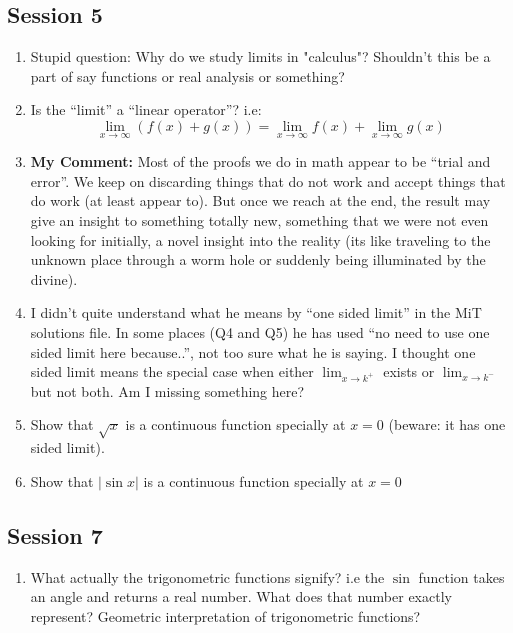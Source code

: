 \documentclass[]{article}
\begin{document}
\subsection{Session 5}

\begin{enumerate}
	\item Stupid question: Why do we study limits in "calculus"? Shouldn't this be a part of say functions or real analysis or something?
	
	\item Is the ``limit'' a ``linear operator''? i.e: 
	$$\lim_{x\to\infty} \left(f(x)+g(x)\right) = \lim_{x\to\infty} f(x) + \lim_{x\to\infty} g(x)$$
	
	\item \textbf{My Comment:} Most of the proofs we do in math appear to be ``trial and error''. We keep on discarding things that do not work and accept things that do work (at least appear to). But once we reach at the end, the result may give an insight to something totally new, something that we were not even looking for initially, a novel insight into the reality (its like traveling to the unknown place through a worm hole or suddenly being illuminated by the divine).
	
	\item I didn't quite understand what he means by ``one sided limit'' in the MiT solutions file. In some places (Q4 and Q5) he has used ``no need to use one sided limit here because..'', not too sure what he is saying. I thought one sided limit means the special case when either $\lim_{x\to k^{+}}$ exists or $\lim_{x\to k^{-}}$ but not both. Am I missing something here?
	
	\item Show that $\sqrt{x}$ is a continuous function specially at $x=0$ (beware: it has one sided limit).
	
	\item Show that $|\sin{x}|$ is a continuous function specially at $x=0$ 
\end{enumerate}

\subsection{Session 7}
\begin{enumerate}
	\item What actually the trigonometric functions signify? i.e the $\sin$ function takes an angle and returns a real number. What does that number exactly represent? Geometric interpretation of trigonometric functions?
\end{enumerate}
\end{document}
